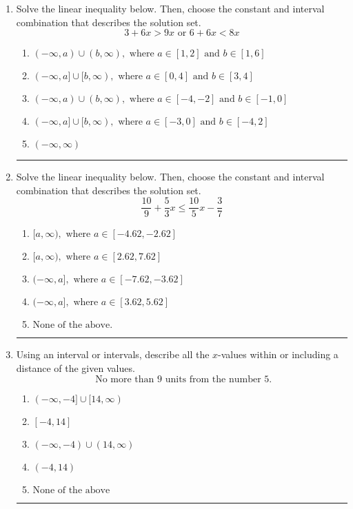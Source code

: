 \documentclass[14pt]{extbook}
\newcommand{\litem}[1]{\item#1\hspace*{-1cm}\rule{\textwidth}{0.4pt}}
\begin{document}
\begin{enumerate}
{\begin{enumerate}[label=\Alph*.]
\end{enumerate} }
\litem{
Solve the linear inequality below. Then, choose the constant and interval combination that describes the solution set.\[ 3 + 6 x > 9 x \text{ or } 6 + 6 x < 8 x \]\begin{enumerate}[label=\Alph*.]
\item \( (-\infty, a) \cup (b, \infty), \text{ where } a \in [1, 2] \text{ and } b \in [1, 6] \)
\item \( (-\infty, a] \cup [b, \infty), \text{ where } a \in [0, 4] \text{ and } b \in [3, 4] \)
\item \( (-\infty, a) \cup (b, \infty), \text{ where } a \in [-4, -2] \text{ and } b \in [-1, 0] \)
\item \( (-\infty, a] \cup [b, \infty), \text{ where } a \in [-3, 0] \text{ and } b \in [-4, 2] \)
\item \( (-\infty, \infty) \)

\end{enumerate} }
\litem{
Solve the linear inequality below. Then, choose the constant and interval combination that describes the solution set.\[ \frac{10}{9} + \frac{5}{3} x \leq \frac{10}{5} x - \frac{3}{7} \]\begin{enumerate}[label=\Alph*.]
\item \( [a, \infty), \text{ where } a \in [-4.62, -2.62] \)
\item \( [a, \infty), \text{ where } a \in [2.62, 7.62] \)
\item \( (-\infty, a], \text{ where } a \in [-7.62, -3.62] \)
\item \( (-\infty, a], \text{ where } a \in [3.62, 5.62] \)
\item \( \text{None of the above}. \)

\end{enumerate} }
\litem{
Using an interval or intervals, describe all the $x$-values within or including a distance of the given values.\[ \text{ No more than } 9 \text{ units from the number } 5. \]\begin{enumerate}[label=\Alph*.]
\item \( (-\infty, -4] \cup [14, \infty) \)
\item \( [-4, 14] \)
\item \( (-\infty, -4) \cup (14, \infty) \)
\item \( (-4, 14) \)
\item \( \text{None of the above} \)

\end{enumerate} }
\end{enumerate}
\end{document}
